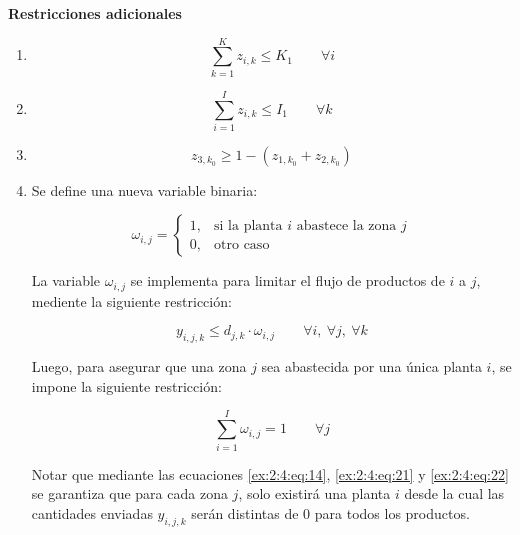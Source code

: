 \textbf{Restricciones adicionales}

\begin{enumerate}
\item
\begin{equation}
    \sum_{k=1}^{K} z_{i,k} \leq K_1
\qquad \forall i
\end{equation}

\item
\begin{equation}
    \sum_{i=1}^{I} z_{i,k} \leq I_1
\qquad \forall k
\end{equation}

\item
\begin{equation}
    z_{3,k_0} \geq 1 - (z_{1,k_0} + z_{2,k_0})
\end{equation}

\item
Se define una nueva variable binaria:

\begin{equation}
    \omega_{i,j} =
\begin{cases}
1, & \text{si la planta } i \text{ abastece la zona } j \\
0, & \text{otro caso}
\end{cases}
\end{equation}

La variable $\omega_{i,j}$ se implementa para limitar el flujo de productos de $i$ a $j$, mediente la siguiente restricción:

\begin{equation}
    y_{i,j,k} \leq d_{j,k} \cdot \omega_{i,j}
\qquad \forall i,\ \forall j,\ \forall k
\label{ex:2:4:eq:21}
\end{equation}

Luego, para asegurar que una zona $j$ sea abastecida por una única planta $i$, se impone la siguiente restricción:

\begin{equation}
    \sum_{i=1}^{I} \omega_{i,j} = 1
\qquad \forall j
\label{ex:2:4:eq:22}
\end{equation}

Notar que mediante las ecuaciones \eqref{ex:2:4:eq:14}, \eqref{ex:2:4:eq:21} y \eqref{ex:2:4:eq:22} se garantiza que para cada zona $j$, solo existirá una planta $i$ desde la cual las cantidades enviadas $y_{i,j,k}$ serán distintas de $0$ para todos los productos.
\end{enumerate}
